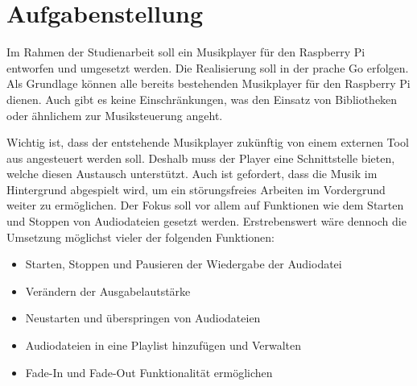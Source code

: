 
\chapter{Aufgabenstellung}

Im Rahmen der Studienarbeit soll ein Musikplayer für den Raspberry Pi entworfen
und umgesetzt werden. Die Realisierung soll in der prache Go erfolgen. Als
Grundlage können alle bereits bestehenden Musikplayer für den Raspberry Pi
dienen. Auch gibt es keine Einschränkungen, was den Einsatz von Bibliotheken
oder ähnlichem zur Musiksteuerung angeht. \hfill \break

Wichtig ist, dass der entstehende Musikplayer zukünftig von einem externen Tool aus
angesteuert werden soll. Deshalb muss der Player eine Schnittstelle bieten,
welche diesen Austausch unterstützt. Auch ist gefordert, dass die Musik im
Hintergrund abgespielt wird, um ein störungsfreies Arbeiten im Vordergrund
weiter zu ermöglichen. \hfill \break
Der Fokus soll vor allem auf Funktionen wie dem Starten und Stoppen von Audiodateien gesetzt werden. Erstrebenswert wäre dennoch die Umsetzung möglichst vieler der
folgenden Funktionen: 

\begin{itemize}
\item Starten, Stoppen und Pausieren der Wiedergabe der Audiodatei
\item Verändern der Ausgabelautstärke
\item Neustarten und überspringen von Audiodateien
\item Audiodateien in eine Playlist hinzufügen und Verwalten
\item Fade-In und Fade-Out Funktionalität ermöglichen
\end{itemize}


